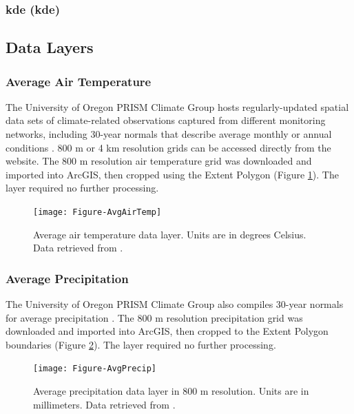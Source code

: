 \subsubsection{\acrlong{kde} (\acrshort{kde})}\label{ssn:kde}

\subsection{Data Layers}

\subsubsection{Average Air Temperature}

The University of Oregon PRISM Climate Group hosts regularly-updated spatial data sets of climate-related observations captured from different monitoring networks, including 30-year normals that describe average monthly or annual conditions \citep{daly_physiographically_2008, prism_prism_2021}. 800 m or 4 km resolution grids can be accessed directly from the website. The 800 m resolution air temperature grid was downloaded and imported into ArcGIS, then cropped using the Extent Polygon (Figure \ref{fig:feat_airtemp}). The layer required no further processing.

\begin{figure}[!htp]
\centering
\texttt{[image: Figure-AvgAirTemp]}
\caption[Average air temperature data layer]{Average air temperature data layer. Units are in degrees Celsius. Data retrieved from \protect\citep{prism_prism_2021}.}
\label{fig:feat_airtemp}
\end{figure}

\subsubsection{Average Precipitation}

The University of Oregon PRISM Climate Group also compiles 30-year normals for average precipitation \citep{daly_physiographically_2008, prism_prism_2021}. The 800 m resolution precipitation grid was downloaded and imported into ArcGIS, then cropped to the Extent Polygon boundaries (Figure \ref{fig:feat_precip}). The layer required no further processing.

\begin{figure}[!htp]
\centering
\texttt{[image: Figure-AvgPrecip]}
\caption[Average precipitation data layer]{Average precipitation data layer in 800 m resolution. Units are in millimeters. Data retrieved from \protect\citep{prism_prism_2021}.}
\label{fig:feat_precip}
\end{figure}

